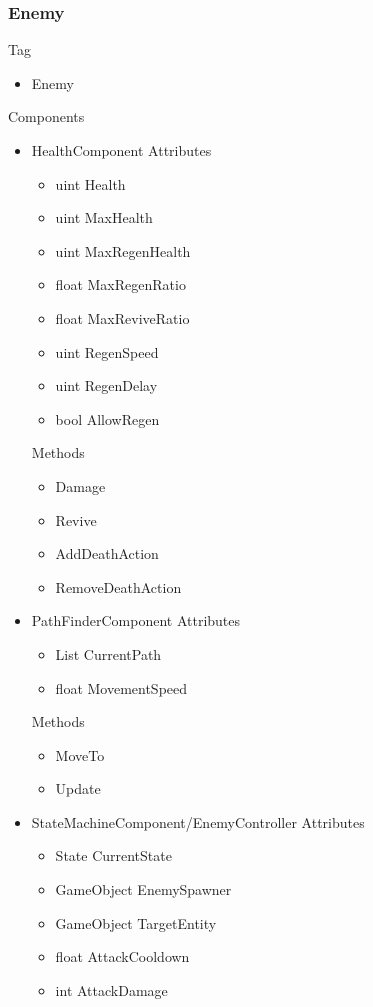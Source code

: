 \documentclass[11pt]{article}
\begin{document}
\subsubsection{Enemy}
Tag
\begin{itemize}
\item Enemy
\end{itemize}
Components
\begin{itemize}
\item HealthComponent
\newline Attributes
\begin{itemize}
\item uint Health
\item uint MaxHealth
\item uint MaxRegenHealth
\item float MaxRegenRatio
\item float MaxReviveRatio
\item uint RegenSpeed
\item uint RegenDelay
\item bool AllowRegen
\end{itemize}
Methods
\begin{itemize}
\item Damage
\item Revive
\item AddDeathAction
\item RemoveDeathAction
\end{itemize}
\item PathFinderComponent
\newline Attributes
\begin{itemize}
\item List CurrentPath
\item float MovementSpeed
\end{itemize}
Methods
\begin{itemize}
\item MoveTo
\item Update
\end{itemize}
\item StateMachineComponent/EnemyController
\newline Attributes
\begin{itemize}
\item State CurrentState
\item GameObject EnemySpawner
\item GameObject TargetEntity
\item float AttackCooldown
\item int AttackDamage 

\end{itemize}
\end{itemize}
\end{document}
